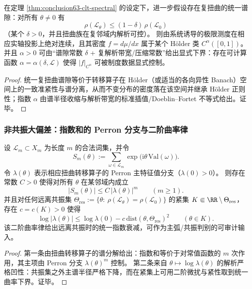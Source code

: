 \begin{corollary}[复扭曲统一谱隙 \texorpdfstring{$\Rightarrow$}{=>} 极限密度的 Hölder 正则]\label{cor:conclusion64-holder-regularity}
在定理 \ref{thm:conclusion63-clt-spectral} 的设定下，进一步假设存在复扭曲的统一谱隙：对所有 \(\theta\neq 0\) 有
\[
\rho(\mathcal{L}_{\theta})\le (1-\delta)\,\rho(\mathcal{L}_0)
\]
（某个 \(\delta>0\)，并且扭曲族在复邻域内解析可控）。
则由系统诱导的极限测度在相应实轴投影上绝对连续，且其密度 \(f=d\mu/dx\) 属于某个 Hölder 类 \(C^{\alpha}([0,1])\)。
并且 \(\alpha>0\) 可由“谱隙常数 \(\delta\) + 复解析带宽/压缩常数”给出显式下界：存在可计算函数 \(\alpha=\alpha(\delta,\mathcal{L})\) 使得 \(|f|_{C^{\alpha}}\) 可被制度数据显式控制。
\end{corollary}

\begin{proof}
统一复扭曲谱隙等价于转移算子在 Hölder（或适当的各向异性 Banach）空间上的一致准紧性与谱分离，从而不变分布的密度落在该空间并继承 Hölder 正则性；指数 \(\alpha\) 由谱半径收缩与解析带宽的标准插值/Doeblin--Fortet 不等式给出。证毕。
\end{proof}

\subsubsection{非共振大偏差：指数和的 Perron 分支与二阶曲率律}

\begin{proposition}\label{prop:conclusion65-expsums-uniform-ldp}
设 \(\mathcal{L}_m\subset X_m\) 为长度 \(m\) 的合法词集，并令
\[
S_m(\theta):=\sum_{\omega\in\mathcal{L}_m}\exp\!\bigl(\mathrm{i}\theta\,\mathrm{Val}(\omega)\bigr).
\]
令 \(\lambda(\theta)\) 表示相应扭曲转移算子的 Perron 主特征值分支（\(\lambda(0)>0\)）。
则存在常数 \(C>0\) 使得对所有 \(\theta\) 在某邻域内成立
\[
\boxed{\;
|S_m(\theta)|\le C\,|\lambda(\theta)|^{m}\qquad(m\ge 1).\;}
\]
并且对任何远离共振集
\(
\Theta_{\mathrm{res}}:=\{\theta:\ \rho(\mathcal{L}_{\theta})=\rho(\mathcal{L}_0)\}
\)
的紧集 \(K\Subset \RR\setminus\Theta_{\mathrm{res}}\)，存在 \(c=c(K)>0\) 使得
\[
\boxed{\;
\log|\lambda(\theta)|
\le \log\lambda(0)-c\,\mathrm{dist}(\theta,\Theta_{\mathrm{res}})^{2}
\qquad(\theta\in K).\;}
\]
该二阶曲率律给出远离共振时的统一指数衰减，可作为主弧/共振判别的可审计输入。
\end{proposition}

\begin{proof}
第一条由扭曲转移算子的谱分解给出：指数和等价于对常值函数的 \(m\) 次作用，其主项由 Perron 分支 \(\lambda(\theta)^{m}\) 控制。
第二条来自 \(\theta\mapsto \log\lambda(\theta)\) 的解析严格凹性：共振集之外主谱半径严格下降，而在紧集上可用二阶微扰与紧性取到统一曲率下界。证毕。
\end{proof}

\endinput
